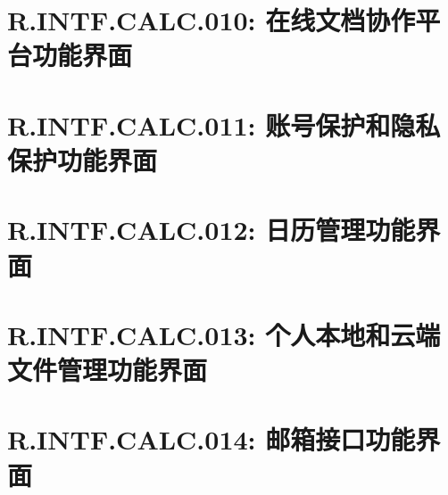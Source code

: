     \section{R.INTF.CALC.010: 在线文档协作平台功能界面}
    
    \section{R.INTF.CALC.011: 账号保护和隐私保护功能界面}
    
    \section{R.INTF.CALC.012: 日历管理功能界面}
    
    \section{R.INTF.CALC.013: 个人本地和云端文件管理功能界面}
    
    \section{R.INTF.CALC.014: 邮箱接口功能界面}
    